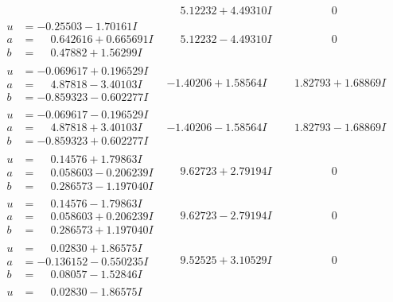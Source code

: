 \documentclass[1p]{elsarticle_modified}
\theoremstyle{definition}
\begin{document}
$$\begin{array}{c|c|c}
 & \phantom{-}5.12232 + 4.49310 I & \phantom{-0.000000 } 0 \\ \hline\begin{aligned}
u &= -0.25503 - 1.70161 I \\
a &= \phantom{-}0.642616 + 0.665691 I \\
b &= \phantom{-}0.47882 + 1.56299 I\end{aligned}
 & \phantom{-}5.12232 - 4.49310 I & \phantom{-0.000000 } 0 \\ \hline\begin{aligned}
u &= -0.069617 + 0.196529 I \\
a &= \phantom{-}4.87818 - 3.40103 I \\
b &= -0.859323 - 0.602277 I\end{aligned}
 & -1.40206 + 1.58564 I & \phantom{-}1.82793 + 1.68869 I \\ \hline\begin{aligned}
u &= -0.069617 - 0.196529 I \\
a &= \phantom{-}4.87818 + 3.40103 I \\
b &= -0.859323 + 0.602277 I\end{aligned}
 & -1.40206 - 1.58564 I & \phantom{-}1.82793 - 1.68869 I \\ \hline\begin{aligned}
u &= \phantom{-}0.14576 + 1.79863 I \\
a &= \phantom{-}0.058603 - 0.206239 I \\
b &= \phantom{-}0.286573 - 1.197040 I\end{aligned}
 & \phantom{-}9.62723 + 2.79194 I & \phantom{-0.000000 } 0 \\ \hline\begin{aligned}
u &= \phantom{-}0.14576 - 1.79863 I \\
a &= \phantom{-}0.058603 + 0.206239 I \\
b &= \phantom{-}0.286573 + 1.197040 I\end{aligned}
 & \phantom{-}9.62723 - 2.79194 I & \phantom{-0.000000 } 0 \\ \hline\begin{aligned}
u &= \phantom{-}0.02830 + 1.86575 I \\
a &= -0.136152 - 0.550235 I \\
b &= \phantom{-}0.08057 - 1.52846 I\end{aligned}
 & \phantom{-}9.52525 + 3.10529 I & \phantom{-0.000000 } 0 \\ \hline\begin{aligned}
u &= \phantom{-}0.02830 - 1.86575 I \\

\end{aligned}
\end{array}$$
\end{document}
